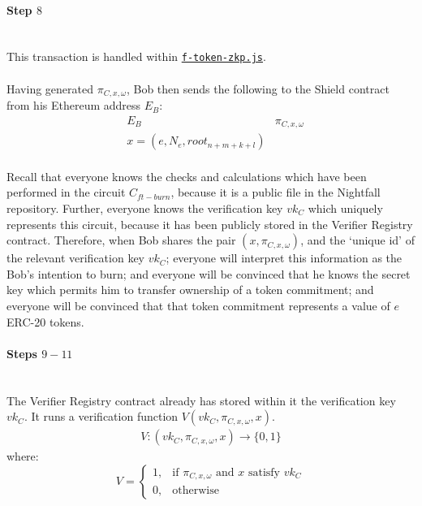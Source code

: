 \documentclass{article}
\begin{document}
\paragraph{Step $8$}
\ \\
This transaction is handled within \hyperref[sec:f-token-zkp]{\texttt{f-token-zkp.js}}.\\
\\
Having generated $\pi_{C,x,\omega}$, Bob then sends the following to the Shield contract from his Ethereum address $E_B$:
\begin{align*}
  &E_B
  &\pi_{C,x,\omega}\\
  &x = (e, N_{e}, root_{n+m+k+l})
\end{align*}
\\
Recall that everyone knows the checks and calculations which have been performed in the circuit $C_{ft-burn}$, because it is a public file in the Nightfall repository. Further, everyone knows the verification key $vk_C$ which uniquely represents this circuit, because it has been publicly stored in the Verifier Registry contract. Therefore, when Bob shares the pair $(x, \pi_{C,x,\omega})$, and the `unique id' of the relevant verification key $vk_C$; everyone will interpret this information as the Bob's intention to burn; and everyone will be convinced that he knows the secret key which permits him to transfer ownership of a token commitment; and everyone will be convinced that that token commitment represents a value of $e$ ERC-20 tokens.



\paragraph{Steps $9 - 11$}
\ \\
The Verifier Registry contract already has stored within it the verification key $vk_C$.
It runs a verification function $V(vk_C, \pi_{C,x,\omega}, x)$.
\begin{align*}
  V: (vk_C, \pi_{C,x,\omega}, x) \to \{0,1\}
\end{align*}
where:
\[
    V=
\begin{cases}
    1,& \text{if } \pi_{C,x,\omega} \text{ and } x \text{ satisfy } vk_C\\
    0,& \text{otherwise}
\end{cases}
\]
\end{document}
